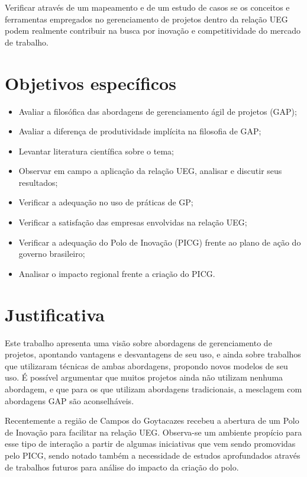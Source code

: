 Verificar através de um mapeamento e de um estudo de casos se os conceitos e ferramentas empregados no gerenciamento de projetos dentro da relação UEG podem realmente contribuir na busca por inovação e competitividade do mercado de trabalho.


\section{Objetivos específicos}

\begin{itemize}
  \item{Avaliar a filosófica das abordagens de gerenciamento ágil de projetos (GAP);}
  \item{Avaliar a diferença de produtividade implícita na filosofia de GAP;}
  \item{Levantar literatura científica sobre o tema;}
  \item{Observar em campo a aplicação da relação UEG, analisar e discutir seus resultados;}
  \item{Verificar a adequação no uso de práticas de GP;}
  \item{Verificar a satisfação das empresas envolvidas na relação UEG;}
  \item{Verificar a adequação do Polo de Inovação (PICG) frente ao plano de ação do governo brasileiro;}
  \item{Analisar o impacto regional frente a criação do PICG.}
\end{itemize}

\section{Justificativa}

Este trabalho apresenta uma visão sobre abordagens de gerenciamento de projetos, apontando vantagens e desvantagens de seu uso, e ainda sobre trabalhos que utilizaram técnicas de ambas abordagens, propondo novos modelos de seu uso. É possível argumentar que muitos projetos ainda não utilizam nenhuma abordagem, e que para os que utilizam abordagens tradicionais, a mesclagem com abordagens GAP são aconselháveis.

Recentemente a região de Campos do Goytacazes recebeu a abertura de um Polo de Inovação para facilitar na relação UEG. Observa-se um ambiente propício para esse tipo de interação a partir de algumas iniciativas que vem sendo promovidas pelo PICG, sendo notado também a necessidade de estudos aprofundados através de trabalhos futuros para análise do impacto da criação do polo.

